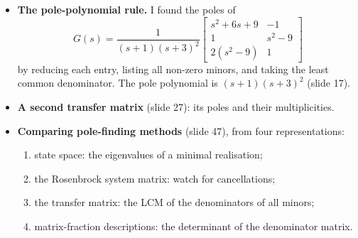 


\begin{itemize}
  \item \textbf{The pole-polynomial rule.} I found the poles of
  \[
  G(s)=\frac{1}{(s+1)(s+3)^2}\begin{bmatrix}s^2+6s+9 & -1\\ 1 & s^2-9\\ 2(s^2-9) & 1\end{bmatrix}
  \]
  by reducing each entry, listing all non-zero minors, and taking the least common denominator. The pole polynomial is $(s+1)(s+3)^2$ (slide 17).
  \item \textbf{A second transfer matrix} (slide 27): its poles and their multiplicities.
  \item \textbf{Comparing pole-finding methods} (slide 47), from four representations:
    \begin{enumerate}
      \item state space: the eigenvalues of a minimal realisation;
      \item the Rosenbrock system matrix: watch for cancellations;
      \item the transfer matrix: the LCM of the denominators of all minors;
      \item matrix-fraction descriptions: the determinant of the denominator matrix.
    \end{enumerate}
\end{itemize}

